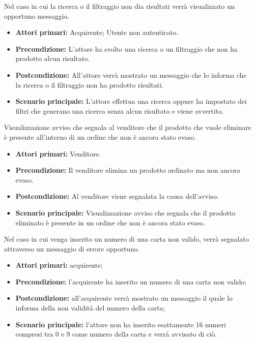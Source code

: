 
Nel caso in cui la ricerca o il filtraggio non dia risultati verrà visualizzato un opportuno messaggio.
\begin{itemize}
	\item \textbf{Attori primari:} Acquirente; Utente non autenticato. 
	\item \textbf{Precondizione:} L'attore ha svolto una ricerca o un filtraggio che non ha prodotto alcun risultato.
	\item \textbf{Postcondizione:} All'attore verrà mostrato un messaggio che lo informa che la ricerca o il filtraggio non ha prodotto risultati.
	\item \textbf{Scenario principale:} L'attore effettua una ricerca oppure ha impostato dei filtri che generano una ricerca senza alcun risultato e viene avvertito.
\end{itemize}

Visualizzazione avviso che segnala al venditore che il prodotto che vuole eliminare è presente all'interno di un ordine che non è ancora stato evaso.
\begin{itemize}
    \item \textbf{Attori primari:} Venditore.
    \item \textbf{Precondizione:} Il venditore elimina un prodotto ordinato ma non ancora evaso.
    \item \textbf{Postcondizione:} Al venditore viene segnalata la causa dell'avviso.
    \item \textbf{Scenario principale:} Visualizzazione avviso che segnala che il prodotto eliminato è presente in un ordine che non è ancora stato evaso.
\end{itemize}

Nel caso in cui venga inserito un numero di una carta non valido, verrà segnalato attraverso un messaggio di errore opportuno.
\begin{itemize}
	\item \textbf{Attori primari:} acquirente;
	\item \textbf{Precondizione:} l'acquirente ha inserito un numero di una carta non valido;
	\item \textbf{Postcondizione:} all'acquirente verrà mostrato un messaggio il quale lo informa della non validità del numero della carta;
	\item \textbf{Scenario principale:} l'attore non ha inserito esattamente 16 numeri compresi tra 0 e 9 come numero della carta e verrà avvisato di ciò.
\end{itemize}


